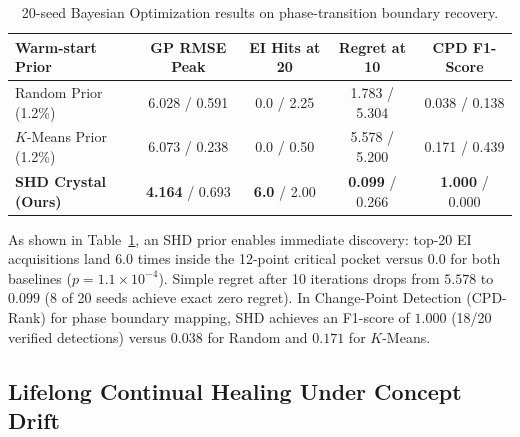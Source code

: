 \documentclass[11pt,a4paper]{article}
\begin{document}
\begin{table}[h]
\centering
\small
\caption{20-seed Bayesian Optimization results on phase-transition boundary recovery.}
\label{tab:bo}
\begin{tabular}{lcccc}
\toprule
\textbf{Warm-start Prior} & \textbf{GP RMSE Peak} & \textbf{EI Hits at 20} & \textbf{Regret at 10} & \textbf{CPD F1-Score} \\
\midrule
Random Prior (1.2\%) & 6.028 / 0.591 & 0.0 / 2.25 & 1.783 / 5.304 & 0.038 / 0.138 \\
$K$-Means Prior (1.2\%) & 6.073 / 0.238 & 0.0 / 0.50 & 5.578 / 5.200 & 0.171 / 0.439 \\
\textbf{SHD Crystal (Ours)} & \textbf{4.164} / 0.693 & \textbf{6.0} / 2.00 & \textbf{0.099} / 0.266 & \textbf{1.000} / 0.000 \\
\bottomrule
\end{tabular}
\end{table}

As shown in Table~\ref{tab:bo}, an SHD prior enables immediate discovery: top-20 EI acquisitions land $6.0$ times inside the 12-point critical pocket versus $0.0$ for both baselines ($p = 1.1 \times 10^{-4}$). Simple regret after 10 iterations drops from $5.578$ to $0.099$ (8 of 20 seeds achieve exact zero regret). In Change-Point Detection (CPD-Rank) for phase boundary mapping, SHD achieves an F1-score of $1.000$ (18/20 verified detections) versus $0.038$ for Random and $0.171$ for $K$-Means.

\subsection{Lifelong Continual Healing Under Concept Drift}
\end{document}

